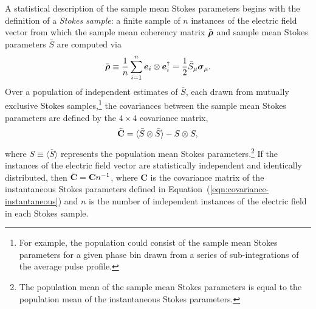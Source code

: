 \documentclass[twocolumn]{aastex6}
\newcommand{\mbf}[1]{\mbox{\boldmath $#1$}}
\newcommand{\Eqn}[1]{Equation~(\ref{eqn:#1})}
\newcommand{\irow}{\mu} \newcommand{\icol}{\nu}
\newcommand{\mean}[1]{\ensuremath{ \langle #1 \rangle }}
\newcommand{\pauli}[1]{\ensuremath{\mbf{\sigma}_{#1}}}
\begin{document}
A statistical description of the sample mean Stokes parameters begins
with the definition of a {\em Stokes sample}: a finite sample of $n$
instances of the electric field vector from which the sample mean
coherency matrix $\bar{\mbf\rho}$ and sample mean Stokes parameters
$\bar{S}$ are computed via
%
\begin{equation}
\label{eqn:local_rho}
\bar{\mbf\rho} \equiv \frac{1}{n} \sum_{i=1}^n \mbf{e}_i \otimes \mbf{e}_i^\dagger
                = \frac{1}{2} \bar{S}_\irow\pauli{\irow}.
\end{equation}
%
Over a population of independent estimates of $\bar S$, each drawn
from mutually exclusive Stokes samples,\footnote{
%
For example, the population could consist of the sample mean Stokes
parameters for a given phase bin drawn from a series of
sub-integrations of the average pulse profile.}
%
the covariances between the sample mean Stokes parameters are defined
by the $4\times4$ covariance matrix,
%
\begin{equation}
{\bar{\bf C}} = \langle \bar{S} \otimes \bar{S} \rangle - S \otimes S,
  \label{eqn:covariance-sample}
\end{equation}
%
where $S\equiv\mean{\bar{S}}$ represents the population mean Stokes
parameters.\footnote {The population mean of the sample
  mean Stokes parameters is equal to the population mean of the
  instantaneous Stokes parameters.}
%
If the instances of the electric field vector are statistically
independent and identically distributed, then ${\bar{\bf C}} = {\bf C}n^{-1}$,
%
where {\bf C} is the covariance matrix of the instantaneous Stokes
parameters defined in \Eqn{covariance-instantaneous} and $n$ is the
number of independent instances of the electric field in each Stokes
sample.
\end{document}
